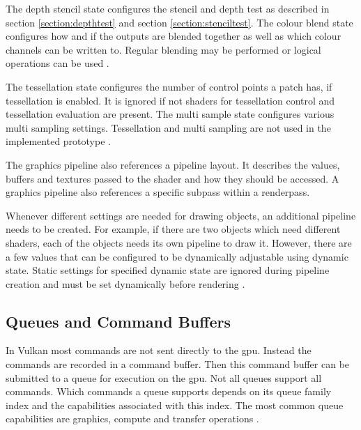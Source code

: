 The depth stencil state configures the stencil and depth test as described in section \ref{section:depthtest} and section \ref{section:stenciltest}. The colour blend state configures how and if the outputs are blended together as well as which colour channels can be written to. Regular blending may be performed or logical operations can be used \cite{khronos:vulkan:spec1.1}.

The tessellation state configures the number of control points a patch has, if tessellation is enabled. It is ignored if not shaders for tessellation control and tessellation evaluation are present. The multi sample state configures various multi sampling settings. Tessellation and multi sampling are not used in the implemented prototype \cite{khronos:vulkan:spec1.1}.

The graphics pipeline also references a pipeline layout. It describes the values, buffers and textures passed to the shader and how they should be accessed. A graphics pipeline also references a specific subpass within a renderpass\cite{khronos:vulkan:spec1.1}.

Whenever different settings are needed for drawing objects, an additional pipeline needs to be created. For example, if there are two objects which need different shaders, each of the objects needs its own pipeline to draw it. However, there are a few values that can be configured to be dynamically adjustable using dynamic state. Static settings for specified dynamic state are ignored during pipeline creation and must be set dynamically before rendering \cite{khronos:vulkan:spec1.1}.

\subsection{Queues and Command Buffers}
In Vulkan most commands are not sent directly to the \gls{gpu}. Instead the commands are recorded in a command buffer. Then this command buffer can be submitted to a queue for execution on the \gls{gpu}. Not all queues support all commands. Which commands a queue supports depends on its queue family index and the capabilities associated with this index. The most common queue capabilities are graphics, compute and transfer operations \cite{khronos:vulkan:spec1.1}.



